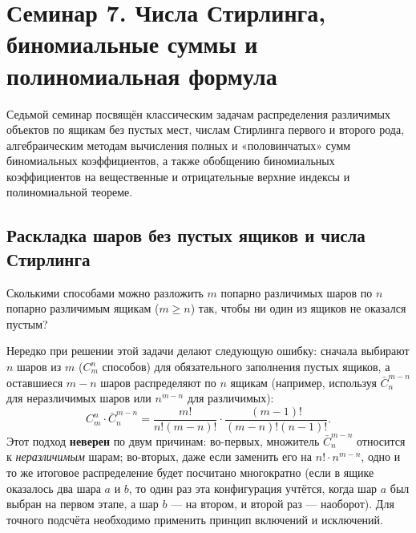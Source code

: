 \section{Семинар 7. Числа Стирлинга, биномиальные суммы и полиномиальная формула}

\begin{remark}
    Седьмой семинар посвящён классическим задачам распределения различимых 
    объектов по ящикам без пустых мест, числам Стирлинга первого и второго 
    рода, алгебраическим методам вычисления полных и «половинчатых» сумм 
    биномиальных коэффициентов, а также обобщению биномиальных коэффициентов 
    на вещественные и отрицательные верхние индексы и полиномиальной теореме.
\end{remark}

\subsection{Раскладка шаров без пустых ящиков и числа Стирлинга}

\begin{problem}
    Сколькими способами можно разложить $m$ попарно различимых шаров по $n$ 
    попарно различимым ящикам ($m \ge n$) так, чтобы ни один из ящиков не 
    оказался пустым?
\end{problem}

\begin{remark}
    Нередко при решении этой задачи делают следующую ошибку: сначала 
    выбирают $n$ шаров из $m$ ($C_m^n$ способов) для обязательного 
    заполнения пустых ящиков, а оставшиеся $m - n$ шаров распределяют 
    по $n$ ящикам (например, используя $\bar{C}_n^{m-n}$ для неразличимых 
    шаров или $n^{m-n}$ для различимых):
    \[
        C_m^n \cdot \bar{C}_n^{m-n} = 
        \frac{m!}{n!(m - n)!} \cdot \frac{(m - 1)!}{(m - n)!(n - 1)!}.
    \]
    Этот подход \textbf{неверен} по двум причинам: во-первых, множитель 
    $\bar{C}_n^{m-n}$ относится к \emph{неразличимым} шарам; во-вторых, даже 
    если заменить его на $n! \cdot n^{m-n}$, одно и то же итоговое 
    распределение будет посчитано многократно (если в ящике оказалось два 
    шара $a$ и $b$, то один раз эта конфигурация учтётся, когда шар $a$ 
    был выбран на первом этапе, а шар $b$ — на втором, и второй раз — 
    наоборот). Для точного подсчёта необходимо применить принцип включений и 
    исключений.
\end{remark}

